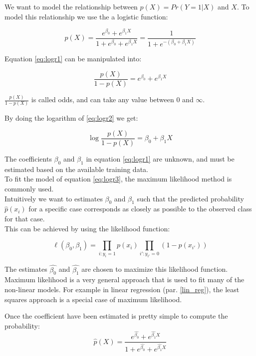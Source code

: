 We want to model the relationship between $p(X) = Pr(Y = 1|X)$ and $X$. To model this relationship we use the a logistic function:

\begin{equation} \label{eq:logr1}
p(X) = \frac{e^{\beta_{0}} + e^{\beta_{1}X}}{1+ e^{\beta_{0}} + e^{\beta_{1}X}} = \frac{1}{1 + e^{-({\beta_{0} + \beta_{1}X})}}
\end{equation} 

Equation \ref{eq:logr1} can be manipulated into: 

\begin{equation} \label{eq:logr2}
\frac{p(X)}{1 - p(X)} = e^{\beta_{0}} + e^{\beta_{1}X}
\end{equation} 

$\frac{p(X)}{1 - p(X)}$ is called odds, and can take any value between $0$ and $\infty$.

By doing the logarithm of \ref{eq:logr2} we get:

\begin{equation} \label{eq:logr3}
\log{\frac{p(X)}{1 - p(X)}} = \beta_{0} + \beta_{1}X
\end{equation} 

The coefficients $\beta_{0}$ and $\beta_{1}$ in equation \ref{eq:logr1} are unknown, and must be estimated based on the available training data. \\
To fit the model of equation \ref{eq:logr3}, the maximum likelihood method is commonly used. \\
Intuitively we want to estimates $\beta_{0}$ and $\beta_{1}$ such that the predicted probability ${\hat{p}}(x_i)$ for a specific case corresponds as closely as possible to the observed class for that case.\\
This can be achieved by using the likelihood function:

\begin{equation} \label{eq:logr4}
\ell(\beta_{0}, \beta_{1}) = \prod_{i:y_i = 1}p(x_i) \prod_{i':{y_{i'}} = 0} (1- p(x_{i'}))
\end{equation} 

The estimates $\hat{\beta_{0}}$ and $\hat{\beta_{1}}$ are chosen to maximize this likelihood function.\\
Maximum likelihood is a very general approach that is used to fit many of the non-linear models. For example in linear regression (par. \ref{lin_reg}), the least squares approach is a special case of maximum likelihood.

Once the coefficient have been estimated is pretty simple to compute the probability:
\begin{equation}
\hat{p}(X) = \frac{e^{\hat{\beta_{0}}} + e^{\hat{\beta_{1}}X}}{1+ e^{\hat{\beta_{0}}} + e^{\hat{\beta_{1}}X}}
\end{equation}

